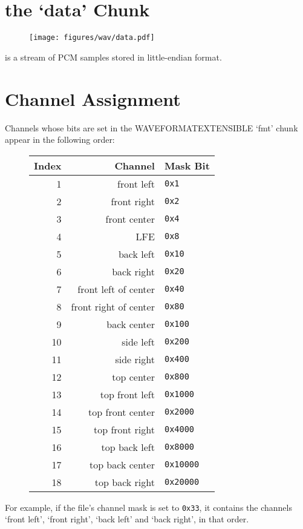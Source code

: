 \section{the `data' Chunk}
\begin{figure}[h]
\texttt{[image: figures/wav/data.pdf]}
\end{figure}
\par
\noindent
{} is a stream of PCM samples stored in little-endian format.

\pagebreak

\section{Channel Assignment}
\label{wave_channel_assignment}
Channels whose bits are set in the WAVEFORMATEXTENSIBLE `fmt' chunk
appear in the following order:
\begin{figure}[h]
\begin{tabular}{| r | r | l |}
\hline
Index & Channel & Mask Bit \\
\hline
1 & front left & \texttt{0x1} \\
2 & front right & \texttt{0x2} \\
3 & front center & \texttt{0x4} \\
4 & LFE & \texttt{0x8} \\
5 & back left & \texttt{0x10} \\
6 & back right & \texttt{0x20} \\
7 & front left of center & \texttt{0x40} \\
8 & front right of center & \texttt{0x80} \\
9 & back center & \texttt{0x100} \\
10 & side left & \texttt{0x200} \\
11 & side right & \texttt{0x400} \\
12 & top center & \texttt{0x800} \\
13 & top front left & \texttt{0x1000} \\
14 & top front center & \texttt{0x2000} \\
15 & top front right & \texttt{0x4000} \\
16 & top back left & \texttt{0x8000} \\
17 & top back center & \texttt{0x10000} \\
18 & top back right & \texttt{0x20000} \\
\hline
\end{tabular}
\end{figure}
\par
\noindent
For example, if the file's channel mask is set to \texttt{0x33},
it contains the channels `front left', `front right',
`back left' and `back right', in that order.
